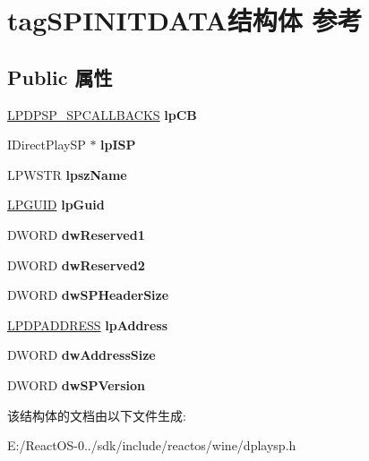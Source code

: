 \hypertarget{structtag_s_p_i_n_i_t_d_a_t_a}{}\section{tag\+S\+P\+I\+N\+I\+T\+D\+A\+T\+A结构体 参考}
\label{structtag_s_p_i_n_i_t_d_a_t_a}
\subsection*{Public 属性}
\begin{DoxyCompactItemize}
\item 
\mbox{\label{structtag_s_p_i_n_i_t_d_a_t_a_a13955a4d2caad1657fe239a9ec14f2f4}} 
\hyperlink{structtag_d_p_s_p___s_p_c_a_l_l_b_a_c_k_s}{L\+P\+D\+P\+S\+P\+\_\+\+S\+P\+C\+A\+L\+L\+B\+A\+C\+KS} {\bfseries lp\+CB}
\item 
\mbox{\label{structtag_s_p_i_n_i_t_d_a_t_a_a5b277f5663fae906feabfa7175c54ea1}} 
I\+Direct\+Play\+SP $\ast$ {\bfseries lp\+I\+SP}
\item 
\mbox{\label{structtag_s_p_i_n_i_t_d_a_t_a_a1bdec440089bad11e7ea44d50803c345}} 
L\+P\+W\+S\+TR {\bfseries lpsz\+Name}
\item 
\mbox{\label{structtag_s_p_i_n_i_t_d_a_t_a_ae85b0e6fa792adf7a225291e40917efb}} 
\hyperlink{interface_g_u_i_d}{L\+P\+G\+U\+ID} {\bfseries lp\+Guid}
\item 
\mbox{\label{structtag_s_p_i_n_i_t_d_a_t_a_ad15ac4f4e50a4f076dd98fa385fe921e}} 
D\+W\+O\+RD {\bfseries dw\+Reserved1}
\item 
\mbox{\label{structtag_s_p_i_n_i_t_d_a_t_a_a1b2d1adbbd0ffb08659314855530935e}} 
D\+W\+O\+RD {\bfseries dw\+Reserved2}
\item 
\mbox{\label{structtag_s_p_i_n_i_t_d_a_t_a_a808fb8d9f5d7dc82addac65fc8fee669}} 
D\+W\+O\+RD {\bfseries dw\+S\+P\+Header\+Size}
\item 
\mbox{\label{structtag_s_p_i_n_i_t_d_a_t_a_ae6d4ea46b95decc2df19369cbc53c006}} 
\hyperlink{structtag_d_p_a_d_d_r_e_s_s}{L\+P\+D\+P\+A\+D\+D\+R\+E\+SS} {\bfseries lp\+Address}
\item 
\mbox{\label{structtag_s_p_i_n_i_t_d_a_t_a_a78b2c61bab1b275ab7a96bf5a0efcd51}} 
D\+W\+O\+RD {\bfseries dw\+Address\+Size}
\item 
\mbox{\label{structtag_s_p_i_n_i_t_d_a_t_a_a03c836c11bb5715155848570a2bd710e}} 
D\+W\+O\+RD {\bfseries dw\+S\+P\+Version}
\end{DoxyCompactItemize}


该结构体的文档由以下文件生成\+:\begin{DoxyCompactItemize}
\item 
E\+:/\+React\+O\+S-\/0../sdk/include/reactos/wine/dplaysp.\+h\end{DoxyCompactItemize}
